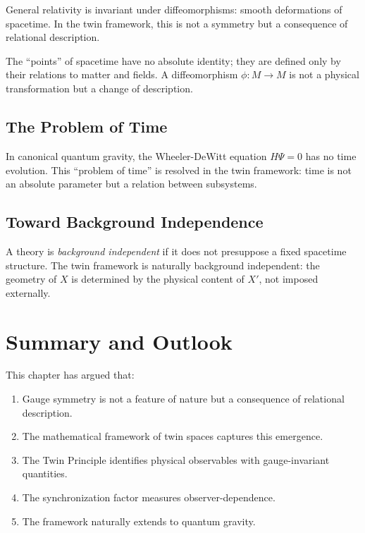 \documentclass[11pt,a4paper,openright]{book}
\theoremstyle{plain}
\theoremstyle{definition}
\begin{document}
General relativity is invariant under diffeomorphisms: smooth deformations of spacetime. In the twin framework, this is not a symmetry but a consequence of relational description.

The ``points'' of spacetime have no absolute identity; they are defined only by their relations to matter and fields. A diffeomorphism $\phi: M \to M$ is not a physical transformation but a change of description.

\subsection{The Problem of Time}

In canonical quantum gravity, the Wheeler-DeWitt equation $\hat{H}\Psi = 0$ has no time evolution. This ``problem of time'' is resolved in the twin framework: time is not an absolute parameter but a relation between subsystems.

\subsection{Toward Background Independence}

A theory is \emph{background independent} if it does not presuppose a fixed spacetime structure. The twin framework is naturally background independent: the geometry of $X$ is determined by the physical content of $X'$, not imposed externally.

\section{Summary and Outlook}

This chapter has argued that:

\begin{enumerate}
    \item Gauge symmetry is not a feature of nature but a consequence of relational description.
    
    \item The mathematical framework of twin spaces captures this emergence.
    
    \item The Twin Principle identifies physical observables with gauge-invariant quantities.
    
    \item The synchronization factor measures observer-dependence.
    
    \item The framework naturally extends to quantum gravity.
\end{enumerate}
\end{document}
